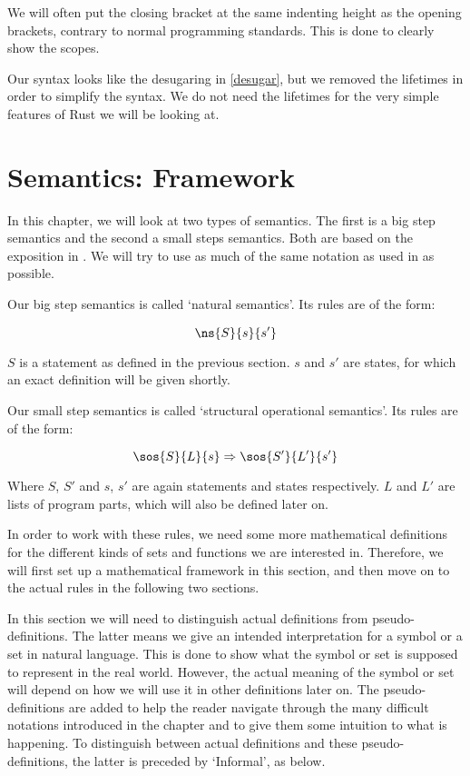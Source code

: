We will often put the closing bracket at the same indenting height as the opening brackets, contrary to normal programming standards. This is done to clearly show the scopes. 

Our syntax looks like the desugaring in \ref{desugar}, but we removed the lifetimes in order to simplify the syntax. We do not need the lifetimes for the very simple features of Rust we will be looking at. 


\section{Semantics: Framework}
In this chapter, we will look at two types of semantics. The first is a big step semantics and the second a small steps semantics. Both are based on the exposition in \cite{nielson1992semantics}. We will try to use as much of the same notation as used in \cite{nielson1992semantics} as possible. 

Our big step semantics is called `natural semantics'. Its rules are of the form: 

$$\ns{S}{s}{s'}$$

$S$ is a statement as defined in the previous section. $s$ and $s'$ are states, for which an exact definition will be given shortly. 

Our small step semantics is called `structural operational semantics'. Its rules are of the form:

$$\sos{S}{L}{s} \Rightarrow \sos{S'}{L'}{s'}$$

Where $S$, $S'$ and $s$, $s'$ are again statements and states respectively. $L$ and $L'$ are lists of program parts, which will also be defined later on. 

In order to work with these rules, we need some more mathematical definitions for the different kinds of sets and functions we are interested in. Therefore, we will first set up a mathematical framework in this section, and then move on to the actual rules in the following two sections. 

In this section we will need to distinguish actual definitions from pseudo-definitions. The latter means we give an intended interpretation for a symbol or a set in natural language. This is done to show what the symbol or set is supposed to represent in the real world. However, the actual meaning of the symbol or set will depend on how we will use it in other definitions later on. The pseudo-definitions are added to help the reader navigate through the many difficult notations introduced in the chapter and to give them some intuition to what is happening. To distinguish between actual definitions and these pseudo-definitions, the latter is preceded by `Informal', as below. 

